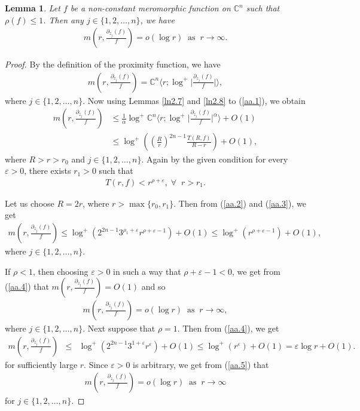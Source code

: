 \documentclass[11pt, reqno]{amsart}
\newtheorem*{cor A}{Corollary A}
\newtheorem*{cor B}{Corollary B}
\newtheorem{lem}{Lemma}[section]
\newcommand{\bea}{\begin{eqnarray}}
\newcommand{\eea}{\end{eqnarray}}
\numberwithin{equation}{section}
\begin{document}
\begin{lem}\label{ln2.9} Let $f$ be a non-constant meromorphic function on $\mathbb{C}^n$ such that $\rho(f)\leq 1$. Then any $j\in\{1,2,\ldots,n\}$, we have
\begin{align*}
m\left(r,\frac{\partial_{z_j}(f)}{f}\right)=o(\log r)\;\;\text{as}\;\;r\to \infty.
\end{align*}
\end{lem}
\begin{proof} By the definition of the proximity function, we have
\begin{align}\label{aa.1}
 m\left(r,\frac{\partial_{z_j}(f)}{f}\right)=\mathbb{C}^n\bigg\langle r;\log^+\bigg|\frac{\partial_{z_j}(f)}{f}\bigg|\bigg\rangle,
 \end{align}
where $j\in\{1,2,\ldots,n\}$. Now using Lemmas \ref{ln2.7} and \ref{ln2.8} to (\ref{aa.1}), we obtain 
\begin{align}\label{aa.2} 
m\left(r,\frac{\partial_{z_j}(f)}{f}\right)&\leq 
\frac{1}{\alpha}\log^+ \mathbb{C}^n\bigg\langle r;\log^+\bigg|\frac{\partial_{z_j}(f)}{f}\bigg|^{\alpha}\bigg\rangle+O(1)\nonumber\\
&\leq
 \log^+\left(\left(\frac{R}{r}\right)^{2n-1}\frac{T(R,f)}{R-r}\right)+O(1),
 \end{align}
where $R>r>r_0$ and $j\in\{1,2,\ldots,n\}$. Again by the given condition for every $\varepsilon>0$, there exists $r_1>0$ such that 
\begin{align}\label{aa.3} 
T(r,f)<r^{\rho+\varepsilon},\;\forall \;\; r>r_1.
\end{align}

Let us choose $R=2r$, where $r>\max\{r_0,r_1\}$. Then from (\ref{aa.2}) and (\ref{aa.3}), we get 
\begin{align}\label{aa.4} 
m\left(r,\frac{\partial_{z_j}(f)}{f}\right)\leq
\log^+(2^{2n-1}3^{\rho_1+\varepsilon}r^{\rho+\varepsilon-1})+O(1)\leq
 \log^+(r^{\rho+\varepsilon-1})+O(1),
 \end{align}
where $j\in\{1,2,\ldots,n\}$. 

If $\rho<1$, then choosing $\varepsilon>0$ in such a way that $\rho+\varepsilon-1<0$, we get from (\ref{aa.4}) that $m\left(r,\frac{\partial_{z_j}(f)}{f}\right)=O(1)$ and so
\begin{align*}
m\left(r,\frac{\partial_{z_j}(f)}{f}\right)=o(\log r)\;\;\text{as}\;\;r\to \infty,
\end{align*}
where $j\in\{1,2,\ldots,n\}$.
Next suppose that $\rho=1$. Then from (\ref{aa.4}), we get
\bea\label{aa.5} m\left(r,\frac{\partial_{z_j}(f)}{f}\right)&\leq & \log^+(2^{2n-1}3^{1+\varepsilon}r^{\varepsilon})+O(1)
 \leq \log^+(r^{\varepsilon})+O(1)=\varepsilon \log r+O(1).\eea
for sufficiently large $r$. Since $\varepsilon>0$ is arbitrary, we get from (\ref{aa.5}) that
\begin{align*}
 m\left(r,\frac{\partial_{z_j}(f)}{f}\right)=o(\log r)\;\;\text{as}\;\;r\to\infty
 \end{align*}
 for $j\in\{1,2,\ldots,n\}$.
\end{proof}
\end{document}
